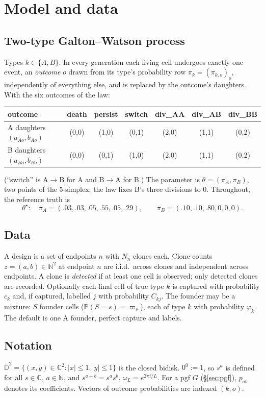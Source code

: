 \documentclass[11pt]{article}
\theoremstyle{definition}
\theoremstyle{remark}
\newcommand{\Prob}{\mathbb{P}}
\newcommand{\N}{\mathbb{N}}
\newcommand{\C}{\mathbb{C}}
\newcommand{\Dbar}{\bar{\mathbb D}^2}
\newcommand{\code}[1]{\texttt{\detokenize{#1}}}
\begin{document}
\section{Model and data}\label{sec:model}
\subsection{Two-type Galton--Watson process}
Types $k\in\{A,B\}$. In every generation each living cell undergoes exactly one event, an \emph{outcome} $o$ drawn from its type's probability row $\pi_k=(\pi_{k,o})_o$, independently of everything else, and is replaced by the outcome's daughters. With the six outcomes of the \code{two_type} law:
\begin{center}\small
\begin{tabular}{@{}lcccccc@{}}\toprule
outcome & death & persist & switch & div\_AA & div\_AB & div\_BB\\\midrule
A daughters $(a_{Ao},b_{Ao})$ & (0,0) & (1,0) & (0,1) & (2,0) & (1,1) & (0,2)\\
B daughters $(a_{Bo},b_{Bo})$ & (0,0) & (0,1) & (1,0) & (2,0) & (1,1) & (0,2)\\\bottomrule
\end{tabular}
\end{center}
(``switch'' is A$\to$B for A and B$\to$A for B.) The parameter is $\theta=(\pi_A,\pi_B)$, two points of the 5-simplex; the \code{reversible_ab} law fixes B's three divisions to 0. Throughout, the reference truth is
\[
\theta^\star:\quad\pi_A=(.03,.03,.05,.55,.05,.29),\qquad\pi_B=(.10,.10,.80,0,0,0).
\]

\subsection{Data}
A design is a set of endpoints $n$ with $N_n$ clones each. Clone counts $z=(a,b)\in\N^2$ at endpoint $n$ are i.i.d.\ across clones and independent across endpoints. A clone is \emph{detected} if at least one cell is observed; only detected clones are recorded. Optionally each final cell of true type $k$ is captured with probability $c_k$ and, if captured, labelled $j$ with probability $C_{kj}$. The founder may be a mixture: $S$ founder cells ($\Prob(S=s)=\varpi_s$), each of type $k$ with probability $\varphi_k$. The default is one A founder, perfect capture and labels.

\subsection{Notation}
$\Dbar=\{(x,y)\in\C^2:|x|\le1,|y|\le1\}$ is the closed bidisk. $0^0:=1$, so $s^a$ is defined for all $s\in\C$, $a\in\N$, and $s^{a+b}=s^as^b$. $\omega_L=e^{2\pi i/L}$. For a pgf $G$ (\S\ref{sec:pgf}), $p_{ab}$ denotes its coefficients. Vectors of outcome probabilities are indexed $(k,o)$.
\end{document}
